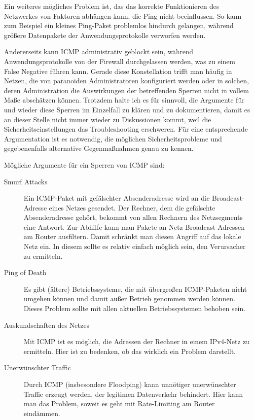 \begin{normaltext}
  Ein weiteres mögliches Problem ist, das das korrekte Funktionieren des
  Netzwerkes von Faktoren abhängen kann, die Ping nicht beeinflussen. So kann
  zum Beispiel ein kleines Ping-Paket problemlos hindurch gelangen, während
  größere Datenpakete der Anwendungsprotokolle verworfen werden.

  Andererseits kann ICMP administrativ geblockt sein, während
  Anwendungsprotokolle von der Firewall durchgelassen werden, was zu einem
  False Negative führen kann. Gerade diese Konstellation trifft man häufig in
  Netzen, die von paranoiden Administratoren konfiguriert werden oder in
  solchen, deren Administration die Auswirkungen der betreffenden Sperren
  nicht in vollem Maße abschätzen können. Trotzdem halte ich es für sinnvoll,
  die Argumente für und wieder diese Sperren im Einzelfall zu klären und zu
  dokumentieren, damit es an dieser Stelle nicht immer wieder zu Diskussionen
  kommt, weil die Sicherheitseinstellungen das Troubleshooting erschweren. Für
  eine entsprechende Argumentation ist es notwendig, die möglichen
  Sicherheitsprobleme und gegebenenfalls alternative Gegenmaßnahmen genau zu
  kennen.

  Mögliche Argumente für ein Sperren von ICMP sind:
  \begin{description}
    \item[Smurf Attacks] Ein ICMP-Paket mit gefälschter Absenderadresse wird
      an die Broadcast-Adresse eines Netzes gesendet. Der Rechner, dem die
      gefälschte Absenderadresse gehört, bekommt von allen Rechnern des
      Netzsegments eine Antwort.
      Zur Abhilfe kann man Pakete an Netz-Broadcast-Adressen am Router
      ausfiltern. Damit schränkt man diesen Angriff auf das lokale Netz ein.
      In diesem sollte es relativ einfach möglich sein, den Verursacher zu
      ermitteln.
    \item[Ping of Death] Es gibt (ältere) Betriebssysteme, die mit übergroßen
      ICMP-Paketen nicht umgehen können und damit außer Betrieb genommen
      werden können. Dieses Problem sollte mit allen aktuellen
      Betriebssystemen behoben sein.
    \item[Auskundschaften des Netzes] Mit ICMP ist es möglich, die Adressen
      der Rechner in einem IPv4-Netz zu ermitteln. Hier ist zu bedenken, ob
      das wirklich ein Problem darstellt.
    \item[Unerwünschter Traffic] Durch ICMP (insbesondere Floodping) kann
      unnötiger unerwünschter Traffic erzeugt werden, der legitimen
      Datenverkehr behindert. Hier kann man das Problem, soweit es geht mit
      Rate-Limiting am Router eindämmen.
  \end{description}


\end{normaltext}
